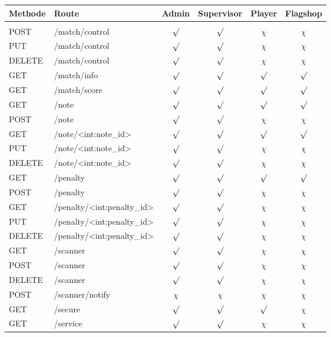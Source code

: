 \begin{table}
	\centering
	\begin{tabular}{l l c c c c}
		Methode & Route	& Admin & Supervisor & Player  & Flagshop \\ [0.5ex]
		\hline &&&&&\\
		POST	& /match/control					& $\surd$ & $\surd$ & $\chi$ & $\chi$ \\
		PUT		& /match/control					& $\surd$ & $\surd$ & $\chi$ & $\chi$ \\
		DELETE	& /match/control					& $\surd$ & $\surd$ & $\chi$ & $\chi$ \\
		GET		& /match/info						& $\surd$ & $\surd$ & $\surd$ & $\surd$ \\
		GET		& /match/score						& $\surd$ & $\surd$ & $\surd$ & $\surd$ \\
		GET		& /note								& $\surd$ & $\surd$ & $\surd$ & $\surd$ \\
		POST	& /note								& $\surd$ & $\surd$ & $\chi$ & $\chi$ \\
		GET 	& /note/<int:note\_id>				& $\surd$ & $\surd$ & $\surd$ & $\surd$ \\
		PUT 	& /note/<int:note\_id>				& $\surd$ & $\surd$ & $\chi$ & $\chi$ \\
		DELETE	& /note/<int:note\_id>				& $\surd$ & $\surd$ & $\chi$ & $\chi$ \\
		GET		& /penalty							& $\surd$ & $\surd$ & $\surd$ & $\surd$ \\
		POST	& /penalty							& $\surd$ & $\surd$ & $\chi$ & $\chi$ \\
		GET		& /penalty/<int:penalty\_id>		& $\surd$ & $\surd$ & $\chi$ & $\chi$ \\
		PUT		& /penalty/<int:penalty\_id>		& $\surd$ & $\surd$ & $\chi$ & $\chi$ \\
		DELETE	& /penalty/<int:penalty\_id>		& $\surd$ & $\surd$ & $\chi$ & $\chi$ \\
		GET		& /scanner							& $\surd$ & $\surd$ & $\chi$ & $\chi$ \\
		POST	& /scanner							& $\surd$ & $\surd$ & $\chi$ & $\chi$ \\
		DELETE	& /scanner							& $\surd$ & $\surd$ & $\chi$ & $\chi$ \\
		POST	& /scanner/notify					& $\chi$ & $\chi$ & $\chi$ & $\chi$ \\
		GET 	& /secure							& $\surd$ & $\surd$ & $\surd$ & $\chi$ \\
		GET		& /service							& $\surd$ & $\surd$ & $\chi$ & $\chi$ \\

\end{tabular}
\end{table}
